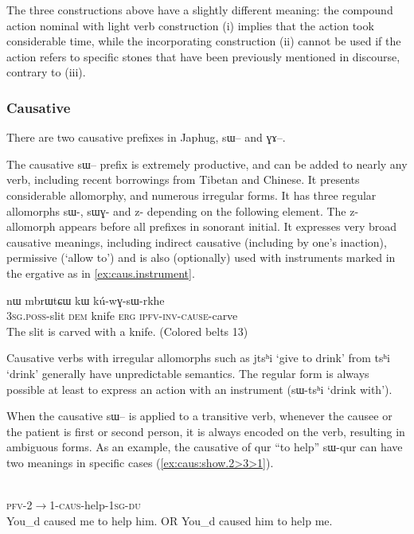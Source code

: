 \documentclass[oldfontcommands,oneside,a4paper,11pt]{article}
\newcommand{\ipa}[1]{{\phon #1}} %
\begin{document}
The three constructions above have a slightly different meaning: the compound action nominal with light verb construction (i) implies that the action took considerable time, while the incorporating construction (ii) cannot be used if the action refers to specific stones that have been previously mentioned in discourse, contrary  to (iii).

\subsubsection{Causative}
There are two causative prefixes in Japhug, \ipa{sɯ--} and \ipa{ɣɤ--}. 

The causative   \ipa{sɯ--} prefix is extremely productive, and can be added to nearly any verb, including recent borrowings from Tibetan and Chinese. It presents  considerable allomorphy, and numerous irregular forms. It has three regular allomorphs \ipa{sɯ-}, \ipa{sɯɣ-} and \ipa{z-} depending on the following element. The \ipa{z-} allomorph appears before all prefixes in sonorant initial. It expresses very broad causative meanings, including indirect causative (including by one's inaction), permissive (`allow to') and is also (optionally) used with  instruments marked in the ergative as in \ref{ex:caus.instrument}.


\begin{exe}
\ex \label{ex:caus.instrument}
\gll  \ipa{ɯ-χto} 	\ipa{nɯ} 	\ipa{mbrɯtɕɯ} 	\ipa{kɯ} 	\ipa{kú-wɣ-sɯ-rkhe}  \\
\textsc{3sg.poss}-slit \textsc{dem} knife \textsc{erg}  \textsc{ipfv-inv-cause}-carve \\
 \glt  The slit is carved with a knife. (Colored belts 13)
\end{exe} 

Causative verbs with irregular allomorphs such as \ipa{jtsʰi} `give to drink'  from \ipa{tsʰi} `drink' generally have unpredictable semantics. The regular form is always possible at least to express an action with an instrument (\ipa{sɯ-tsʰi} `drink with').

When the causative \ipa{sɯ--} is applied to a transitive verb, whenever the causee or the patient is first or second person, it is always encoded on the verb, resulting in ambiguous forms. As an example, the causative of \ipa{qur} ``to help''  \ipa{sɯ-qur} can have two meanings in specific cases (\ref{ex:caus:show.2>3>1}).

\begin{exe} 
\ex \label{ex:caus:show.2>3>1}
\gll   \ipa{tɤ-kɯ-sɯ-qur-a-ndʑi}  \\
 \textsc{pfv-2$\rightarrow$1-caus}-help-\textsc{1sg-du}  \\
 \glt  You_d caused me to help him. OR You_d caused him to help me. 
\end{exe} 
\end{document}
